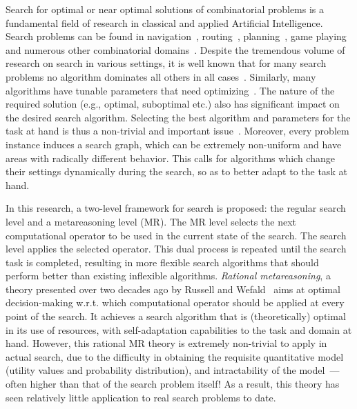 Search for optimal or near optimal solutions of combinatorial problems
is a fundamental field of research in classical and applied Artificial
Intelligence. Search problems can be found in
navigation~\cite{Kocsis.uct}, routing~\cite{Bellman.routing},
planning~\cite{Domshlak.maxornot}, game
playing \cite{Braudis.pachi,Good.chess} and numerous other
combinatorial domains~\cite{Korf.partitioning}.  Despite the
tremendous volume of research on search in various settings, it is
well known that for many search problems no algorithm dominates all
others in all cases~\cite{Wolpert.nofree}. Similarly, many algorithms
have tunable parameters that need
optimizing~\cite{Hutter.spo,TolpinShimony.raticomp}. The nature of the
required solution (e.g., optimal, suboptimal etc.) also has
significant impact on the desired search algorithm. Selecting the best
algorithm and parameters for the task at hand is thus a non-trivial
and important issue~\cite{Allen.selheur,Gomes.portfolio}. Moreover,
every problem instance induces a search graph, which can be extremely
non-uniform and have areas with radically different behavior. This
calls for algorithms which change their settings dynamically during
the search, so as to better adapt to the task at hand.

In this research, a two-level framework for search is proposed: the
regular search level and a metareasoning level (MR). The MR level
selects the next computational operator to be used in the current
state of the search. The search level applies the selected
operator. This dual process is repeated until the search task is
completed, resulting in more flexible search algorithms that should
perform better than existing inflexible algorithms.  \textit{Rational
metareasoning}, a theory presented over two decades ago by Russell and
Wefald~\cite{Russell.right} aims at optimal decision-making
w.r.t. which computational operator should be applied at every point
of the search. It achieves a search algorithm that is (theoretically)
optimal in its use of resources, with self-adaptation capabilities to
the task and domain at hand. However, this rational MR theory is
extremely non-trivial to apply in actual search, due to the difficulty
in obtaining the requisite quantitative model (utility values and
probability distribution), and intractability of the
model~\cite{Conitzer.complexity}---often higher than that of the
search problem itself!  As a result, this theory has seen relatively
little application to real search problems to date.


